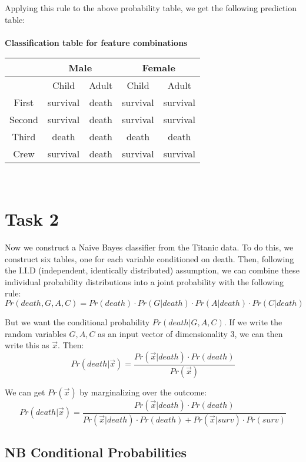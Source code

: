 \documentclass[letterpaper, 10pt]{article}
\begin{document}
Applying this rule to the above probability table, we get the following prediction table:
\\\\
\textbf{Classification table for feature combinations} \\
\begin{tabular}{| c | c | c | c | c | }
    \hline
    & \multicolumn{2}{|c|}{Male} & \multicolumn{2}{|c|}{Female} \\ \hline
            & Child     & Adult     & Child     & Adult     \\ \hline
    First   & survival  & death     & survival  & survival  \\ \hline
    Second  & survival  & death     & survival  & survival  \\ \hline
    Third   & death     & death     & death     & death     \\ \hline
    Crew    & survival  & death     & survival  & survival  \\ 
    \hline
\end{tabular}
\\

\section{Task 2}
Now we construct a Naive Bayes classifier from the Titanic data. To do this, we construct six tables, one for each variable conditioned on death. Then, following the I.I.D (independent, identically distributed) assumption, we can combine these individual probability distributions into a joint probability with the following rule:
$$ Pr(death,G,A,C) = Pr(death) \cdot Pr(G|death) \cdot Pr(A|death) \cdot Pr(C|death) $$

But we want the conditional probability $Pr(death|G,A,C)$. If we write the random variables $G, A, C$ as an input vector of dimensionality 3, we can then write this as $\vec{x}$. Then:
$$ Pr(death|\vec{x}) = \frac{Pr(\vec{x}|death) \cdot Pr(death)}{Pr(\vec{x})} $$

We can get $Pr(\vec{x})$ by marginalizing over the outcome:
$$ Pr(death|\vec{x}) = \frac{Pr(\vec{x}|death) \cdot Pr(death)}{Pr(\vec{x}|death) \cdot Pr(death) + Pr(\vec{x}|surv) \cdot Pr(surv)} $$

\subsection{NB Conditional Probabilities}
\end{document}
